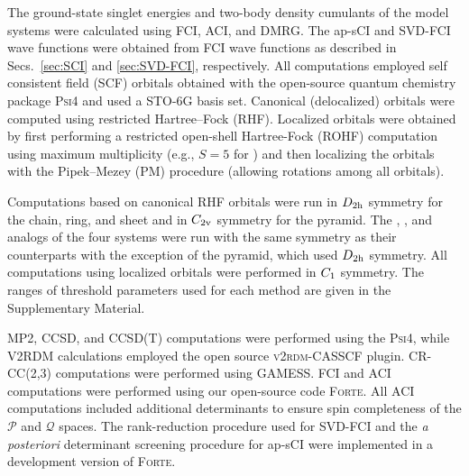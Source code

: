 \documentclass[aip,jcp,amsmath,amssymb, reprint]{revtex4-1}
\begin{document}
The ground-state singlet energies and two-body density cumulants of the model systems were calculated using FCI, ACI, and DMRG.
The ap-sCI and SVD-FCI wave functions were obtained from FCI wave functions as described in Secs.~\ref{sec:SCI} and \ref{sec:SVD-FCI}, respectively. 
All computations employed self consistent field (SCF) orbitals obtained with the open-source quantum chemistry package \textsc{Psi4}\cite{Parrish2017Psi4, smith2020psi4} and used a STO-6G basis set.\cite{Hehre1969ASelf}
Canonical (delocalized) orbitals were computed using restricted Hartree--Fock (RHF).
Localized orbitals were obtained by first performing a restricted open-shell Hartree-Fock  (ROHF) computation using maximum multiplicity (e.g., $S = 5$ for ) and then localizing the orbitals with the Pipek--Mezey (PM) \cite{Pipek1989FastIntrinsic} procedure (allowing rotations among all orbitals).

Computations based on canonical RHF orbitals were run in $D_{\rm{2h}}$ symmetry for the  chain, ring, and sheet and in $C_{2\rm{v}}$ symmetry for the  pyramid.
The , , and  analogs of the four systems were run with the same symmetry as their  counterparts with the exception of the  pyramid, which used $D_{\rm{2h}}$ symmetry.   
All computations using localized orbitals were performed in $C_{\rm{1}}$ symmetry.
The ranges of threshold parameters used for each method are given in the Supplementary Material.

MP2, CCSD, and CCSD(T) computations were performed using the  \textsc{Psi4}, while V2RDM calculations employed the open source \textsc{v2rdm-CASSCF} plugin. \cite{Fosso2016LargeScale}  
CR-CC(2,3) computations were performed using GAMESS.\cite{barca2020recent}
FCI and ACI computations were performed using our open-source code \textsc{Forte}.\cite{Evangelista2019Forte}  
All ACI computations included additional determinants to ensure spin completeness of the $\mathcal{P}$ and $\mathcal{Q}$ spaces.
The rank-reduction procedure used for SVD-FCI and the \textit{a posteriori} determinant screening procedure for ap-sCI were  implemented in a development version of \textsc{Forte}.
\end{document}
